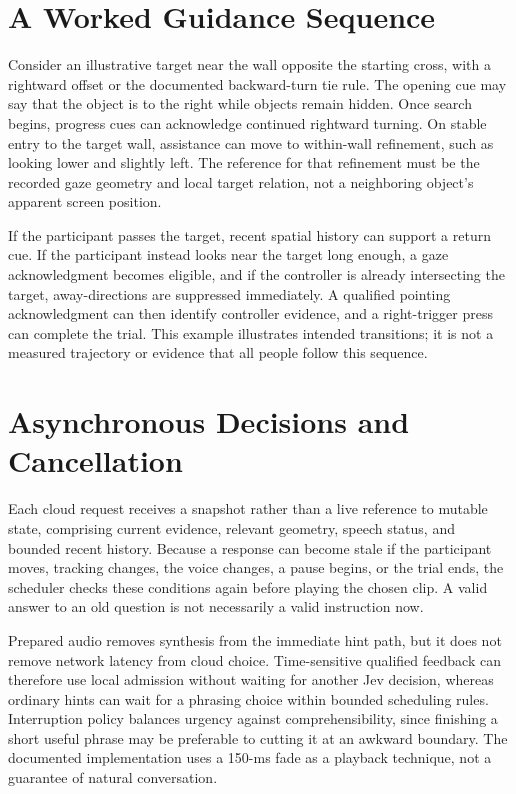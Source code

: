 \section{A Worked Guidance Sequence}
Consider an illustrative target near the wall opposite the starting cross, with a rightward offset or the documented backward-turn tie rule. The opening cue may say that the object is to the right while objects remain hidden. Once search begins, progress cues can acknowledge continued rightward turning. On stable entry to the target wall, assistance can move to within-wall refinement, such as looking lower and slightly left. The reference for that refinement must be the recorded gaze geometry and local target relation, not a neighboring object's apparent screen position.

If the participant passes the target, recent spatial history can support a return cue. If the participant instead looks near the target long enough, a gaze acknowledgment becomes eligible, and if the controller is already intersecting the target, away-directions are suppressed immediately. A qualified pointing acknowledgment can then identify controller evidence, and a right-trigger press can complete the trial. This example illustrates intended transitions; it is not a measured trajectory or evidence that all people follow this sequence.

\section{Asynchronous Decisions and Cancellation}
Each cloud request receives a snapshot rather than a live reference to mutable state, comprising current evidence, relevant geometry, speech status, and bounded recent history. Because a response can become stale if the participant moves, tracking changes, the voice changes, a pause begins, or the trial ends, the scheduler checks these conditions again before playing the chosen clip. A valid answer to an old question is not necessarily a valid instruction now.

Prepared audio removes synthesis from the immediate hint path, but it does not remove network latency from cloud choice. Time-sensitive qualified feedback can therefore use local admission without waiting for another Jev decision, whereas ordinary hints can wait for a phrasing choice within bounded scheduling rules. Interruption policy balances urgency against comprehensibility, since finishing a short useful phrase may be preferable to cutting it at an awkward boundary. The documented implementation uses a 150-ms fade as a playback technique, not a guarantee of natural conversation.

